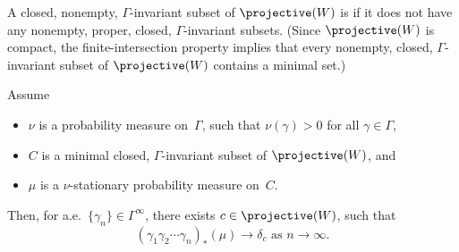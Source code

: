 \begin{defn}
A closed, nonempty, $\Gamma$-invariant subset of $\projective(W)$ is  if it does not have any nonempty, proper, closed, $\Gamma$-invariant subsets. (Since $\projective(W)$ is compact, the finite-intersection property implies that every nonempty, closed, $\Gamma$-invariant subset of $\projective(W)$ contains a minimal set.)
\end{defn}

\begin{thm} \label{meanprox}
Assume 
	\begin{itemize}
	\item $\nu$ is a probability measure on~$\Gamma$, such that $\nu(\gamma) > 0$ for all $\gamma \in \Gamma$,
	\item $C$ is a minimal closed, $\Gamma$-invariant subset of $\projective(W)$,
	and
	\item $\mu$ is a $\nu$-stationary probability measure on~$C$. 
	\end{itemize}
Then, for a.e.\ $\{\gamma_n\} \in \Gamma^\infty$, there exists $c \in \projective(W)$, such that 
	$$ \text{$(\gamma_1 \gamma_2 \cdots \gamma_n)_*(\mu) \to \delta_c$ as $n \to \infty$.} $$
\end{thm}

